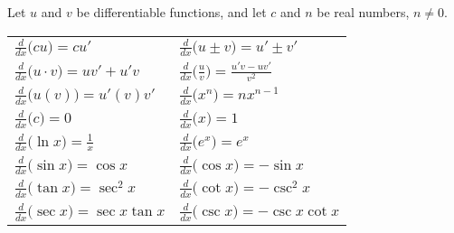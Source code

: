 {Let $u$ and $v$ be differentiable functions, and let $c$ and $n$ be real numbers, $n\neq 0$. \\
\begin{anywhereenum}
\renewcommand{\arraystretch}{1.6}
\begin{tabular}{ll}
	\item		$\frac{d}{dx}\big(cu\big) = cu'$ &
	\item		$\frac{d}{dx}\big(u\pm v\big) = u'\pm v'$ \\
	\item		$\frac{d}{dx}\big(u\cdot v\big) = uv'+u'v$ &
	\item		$\frac{d}{dx}\big(\frac uv\big) = \frac{u'v-uv'}{v^2}$ \\
	\item		$\frac{d}{dx}\big(u(v)\big) = u'(v)v'$ &
	\item		$\frac{d}{dx}\big(x^n\big) = nx^{n-1}$ \\
	\item		$\frac{d}{dx}\big(c\big) = 0$ &
	\item		$\frac{d}{dx}\big(x\big) = 1$ \\
	\item		$\frac{d}{dx}\big(\ln x\big) = \frac{1}{x}$ &
	\item		$\frac{d}{dx}\big(e^x\big) = e^x$ \\
	\item		$\frac{d}{dx}\big(\sin x\big) = \cos x$ &
	\item		$\frac{d}{dx}\big(\cos x\big) = -\sin x$ \\
	\item		$\frac{d}{dx}\big(\tan x\big) = \sec^2x$ &
	\item		$\frac{d}{dx}\big(\cot x\big) = -\csc^2x$ \\
	\item		$\frac{d}{dx}\big(\sec x\big) = \sec x\tan x$\qquad\null &
	\item		$\frac{d}{dx}\big(\csc x\big) = -\csc x\cot x$
\end{tabular}
\end{anywhereenum}}

